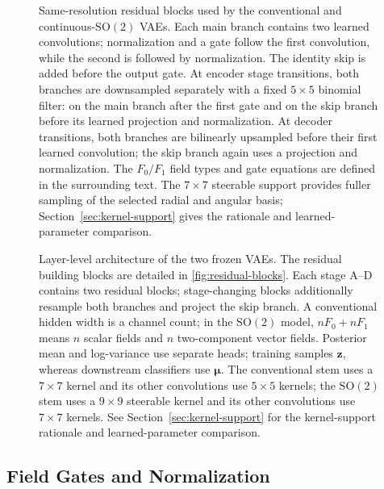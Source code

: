 \documentclass{midl}
\newcommand{\SOtwo}{\mathrm{SO}(2)}
\begin{document}
\begin{figure}[t]
\centering

\caption{Same-resolution residual blocks used by the conventional and continuous-$\SOtwo$ VAEs. Each main branch contains two learned convolutions; normalization and a gate follow the first convolution, while the second is followed by normalization. The identity skip is added before the output gate. At encoder stage transitions, both branches are downsampled separately with a fixed $5\times5$ binomial filter: on the main branch after the first gate and on the skip branch before its learned projection and normalization. At decoder transitions, both branches are bilinearly upsampled before their first learned convolution; the skip branch again uses a projection and normalization. The $F_0/F_1$ field types and gate equations are defined in the surrounding text. The $7\times7$ steerable support provides fuller sampling of the selected radial and angular basis; Section~\ref{sec:kernel-support} gives the rationale and learned-parameter comparison.}
\label{fig:residual-blocks}
\end{figure}

\begin{figure}[t]
\centering
\resizebox{0.98\textwidth}{!}{}
\caption{Layer-level architecture of the two frozen VAEs. The residual building blocks are detailed in \autoref{fig:residual-blocks}. Each stage A--D contains two residual blocks; stage-changing blocks additionally resample both branches and project the skip branch. A conventional hidden width is a channel count; in the $\SOtwo$ model, $nF_0+nF_1$ means $n$ scalar fields and $n$ two-component vector fields. Posterior mean and log-variance use separate heads; training samples $\mathbf z$, whereas downstream classifiers use $\boldsymbol\mu$. The conventional stem uses a $7\times7$ kernel and its other convolutions use $5\times5$ kernels; the $\SOtwo$ stem uses a $9\times9$ steerable kernel and its other convolutions use $7\times7$ kernels. See Section~\ref{sec:kernel-support} for the kernel-support rationale and learned-parameter comparison.}
\label{fig:vae-architectures}
\end{figure}

\subsection{Field Gates and Normalization}
\end{document}
